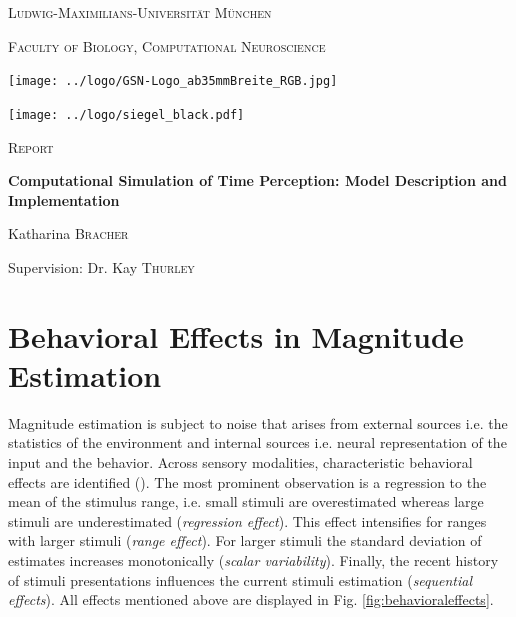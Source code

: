 \documentclass[10pt]{article}
\begin{document}
\begin{titlepage}
	\centering
	{\scshape\LARGE Ludwig-Maximilians-Universität München \par}
	{\scshape\large Faculty of Biology, Computational Neuroscience \par}
	\vspace{0.5cm}
	\texttt{[image: ../logo/GSN-Logo\_ab35mmBreite\_RGB.jpg]}\par
	\texttt{[image: ../logo/siegel\_black.pdf]}\par
	\vspace{0.7cm}
	{\scshape\LARGE Report \par}
	\vspace{0.05cm}
	{\huge\bfseries Computational Simulation of Time Perception: Model Description and Implementation \par}
	\vspace{1.5cm}
	{\Large Katharina \textsc{Bracher} \par}
	\vspace{0.4cm}
	{\large Supervision: Dr. Kay \textsc{Thurley} \par}
\end{titlepage}


\normalsize
\tableofcontents
\pagebreak


\section{Behavioral Effects in Magnitude Estimation}
Magnitude estimation is subject to noise that arises from external sources i.e. the statistics of the environment and internal sources i.e. neural representation of the input and the behavior.
Across sensory modalities, characteristic behavioral effects are identified (\cite{Petzschner2015}).
The most prominent observation is a regression to the mean of the stimulus range,  i.e. small stimuli are overestimated whereas large stimuli are underestimated (\textit{regression effect}). 
This effect intensifies for ranges with larger stimuli (\textit{range effect}).
For larger stimuli the standard deviation of estimates increases monotonically (\textit{scalar variability}). 
Finally, the recent history of stimuli presentations influences the current stimuli estimation (\textit{sequential effects}).
All effects mentioned above are displayed in Fig. \ref{fig:behavioraleffects}. 
\end{document}
